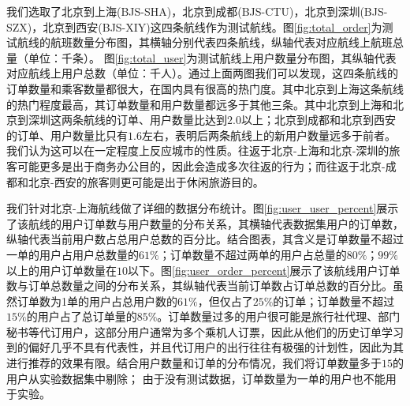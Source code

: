 \begin{figure}[!h]
\centering
{}
\end{figure}

我们选取了北京到上海(BJS-SHA)，北京到成都(BJS-CTU)，北京到深圳(BJS-SZX)，北京到西安(BJS-XIY)这四条航线作为测试航线。图\ref{fig:total_order}为测试航线的航班数量分布图，其横轴分别代表四条航线，纵轴代表对应航线上航班总量（单位：千条）。
图\ref{fig:total_user}为测试航线上用户数量分布图，其纵轴代表对应航线上用户总数（单位：千人）。通过上面两图我们可以发现，这四条航线的订单数量和乘客数量都很大，在国内具有很高的热门度。其中北京到上海这条航线的热门程度最高，其订单数量和用户数量都远多于其他三条。其中北京到上海和北京到深圳这两条航线的订单、用户数量比达到$2.0$以上；北京到成都和北京到西安的订单、用户数量比只有$1.6$左右，表明后两条航线上的新用户数量远多于前者。我们认为这可以在一定程度上反应城市的性质。往返于北京-上海和北京-深圳的旅客可能更多是出于商务办公目的，因此会造成多次往返的行为；而往返于北京-成都和北京-西安的旅客则更可能是出于休闲旅游目的。

\begin{figure}[!h]
\centering
{}
\end{figure}

我们针对北京-上海航线做了详细的数据分布统计。图\ref{fig:user_user_percent}展示了该航线的用户订单数与用户数量的分布关系，其横轴代表数据集用户的订单数，纵轴代表当前用户数占总用户总数的百分比。结合图表，其含义是订单数量不超过一单的用户占用户总数量的$61\%$；订单数量不超过两单的用户占总量的$80\%$；$99\%$以上的用户订单数量在$10$以下。图\ref{fig:user_order_percent}展示了该航线用户订单数与订单总数量之间的分布关系，其纵轴代表当前订单数占订单总数的百分比。虽然订单数为1单的用户占总用户数的$61\%$，但仅占了$25\%$的订单；订单数量不超过$15\%$的用户占了总订单量的$85\%$。订单数量过多的用户很可能是旅行社代理、部门秘书等代订用户，这部分用户通常为多个乘机人订票，因此从他们的历史订单学习到的偏好几乎不具有代表性，并且代订用户的出行往往有极强的计划性，因此为其进行推荐的效果有限。结合用户数量和订单的分布情况，我们将订单数量多于$15$的用户从实验数据集中剔除；
由于没有测试数据，订单数量为一单的用户也不能用于实验。

